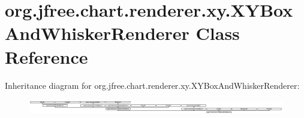 \hypertarget{classorg_1_1jfree_1_1chart_1_1renderer_1_1xy_1_1_x_y_box_and_whisker_renderer}{}\section{org.\+jfree.\+chart.\+renderer.\+xy.\+X\+Y\+Box\+And\+Whisker\+Renderer Class Reference}
\label{classorg_1_1jfree_1_1chart_1_1renderer_1_1xy_1_1_x_y_box_and_whisker_renderer}
Inheritance diagram for org.\+jfree.\+chart.\+renderer.\+xy.\+X\+Y\+Box\+And\+Whisker\+Renderer\+:\begin{figure}[H]
\begin{center}
\leavevmode
\includegraphics[height=0.664688cm]{classorg_1_1jfree_1_1chart_1_1renderer_1_1xy_1_1_x_y_box_and_whisker_renderer}
\end{center}
\end{figure}
